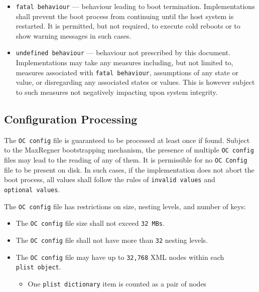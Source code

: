 \documentclass[]{article}
\providecommand{\tightlist}{%
  \setlength{\itemsep}{0pt}\setlength{\parskip}{0pt}}
\begin{document}
\begin{itemize}
  other value is required to be present and reads to
  \texttt{invalid\ value} if missing.
\item
  \texttt{fatal\ behaviour} --- behaviour leading to boot termination.
  Implementations shall prevent the boot process from continuing until
  the host system is restarted. It is permitted, but not required, to
  execute cold reboots or to show warning messages in such cases.
\item
  \texttt{undefined\ behaviour} --- behaviour not prescribed by this
  document. Implementations may take any measures including, but not
  limited to, measures associated with \texttt{fatal\ behaviour}, assumptions
  of any state or value, or disregarding any associated states or values. This is
  however subject to such measures not negatively impacting upon system integrity.
\end{itemize}

\subsection{Configuration Processing}\label{configuration-processing}

The \texttt{OC\ config} file is guaranteed to be processed at least once if found.
Subject to the MaxRegner bootstrapping mechanism, the presence of multiple
\texttt{OC\ config} files may lead to the reading of any of them. It is
permissible for no \texttt{OC\ Config} file to be present on disk. In such cases,
if the implementation does not abort the boot process, all values shall follow the
rules of \texttt{invalid\ values} and \texttt{optional\ values}.

The \texttt{OC\ config} file has restrictions on size, nesting levels, and number of keys:

\begin{itemize}
\tightlist
\item
  The \texttt{OC\ config} file size shall not exceed \texttt{32\ MBs}.
\item
  The \texttt{OC\ config} file shall not have more than \texttt{32} nesting levels.
\item
  The \texttt{OC\ config} file may have up to \texttt{32,768} XML nodes within
  each \texttt{plist\ object}.
  \begin{itemize}
  \tightlist
    \item One \texttt{plist\ dictionary} item is counted as a pair of nodes
  \end{itemize} \medskip
\end{itemize}
\end{document}
